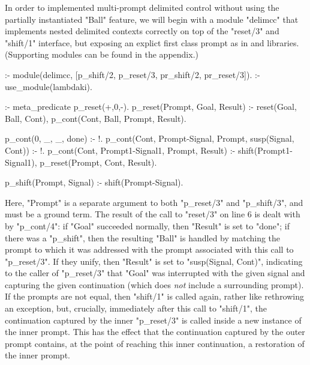 In order to implemented multi-prompt delimited control without using the partially instantiated
"Ball" feature, we will begin with a module "delimcc" that implements nested delimited contexts
correctly on top of the "reset/3" and "shift/1" interface, but exposing an explict first class prompt
as in  and  libraries. 
(Supporting modules can be found in the appendix.)
\begin{prolog-framed}[name=delimcc]
  :- module(delimcc, [p_shift/2, p_reset/3, pr_shift/2, pr_reset/3]).
  :- use_module(lambdaki).

  :- meta_predicate p_reset(+,0,-).
  p_reset(Prompt, Goal, Result) :-
     reset(Goal, Ball, Cont),
     p_cont(Cont, Ball, Prompt, Result).

  p_cont(0, _, _, done) :- !.
  p_cont(Cont, Prompt-Signal, Prompt, susp(Signal, Cont)) :- !.
  p_cont(Cont, Prompt1-Signal1, Prompt, Result) :-
     shift(Prompt1-Signal1),
     p_reset(Prompt, Cont, Result).

  p_shift(Prompt, Signal) :- shift(Prompt-Signal).
\end{prolog-framed}
Here, "Prompt" is a separate argument to both "p_reset/3" and "p_shift/3", and must be a
ground term. The result of the call to "reset/3" on line 6 is dealt with by "p_cont/4": if "Goal" succeeded normally,
then "Result" is set to "done"; if there was a "p_shift", then the resulting
"Ball" is handled by matching the prompt to which it was addressed with the prompt associated with
this call to "p_reset/3". If they unify, then "Result" is set to "susp(Signal, Cont)",
indicating to the caller of "p_reset/3" that "Goal" was interrupted with the given signal
and capturing the given continuation (which does \emph{not} include a surrounding prompt).
If the prompts are not equal, then "shift/1" is called again, rather like rethrowing an exception,
but, crucially, immediately after this call to "shift/1", the continuation captured by the
inner "p_reset/3" is called inside a new instance of the inner prompt. This has the effect that
the continuation captured by the outer prompt contains, at the point of reaching this inner
continuation, a restoration of the inner prompt.

